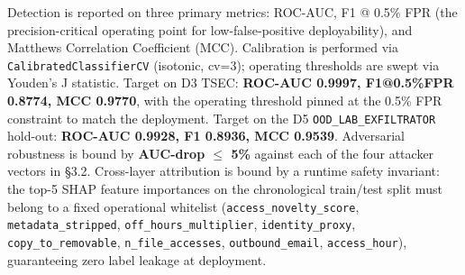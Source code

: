 Detection is reported on three primary metrics: ROC-AUC, F1 @ 0.5\% FPR (the precision-critical operating point for low-false-positive deployability), and Matthews Correlation Coefficient (MCC). Calibration is performed via \texttt{CalibratedClassifierCV} (isotonic, cv=3); operating thresholds are swept via Youden's J statistic. Target on D3 TSEC: \textbf{ROC-AUC 0.9997, F1@0.5\%FPR 0.8774, MCC 0.9770}, with the operating threshold pinned at the 0.5\% FPR constraint to match the deployment. Target on the D5 \texttt{OOD\_\allowbreak LAB\_\allowbreak EXFILTRATOR} hold-out: \textbf{ROC-AUC 0.9928, F1 0.8936, MCC 0.9539}. Adversarial robustness is bound by \textbf{AUC-drop $\le$ 5\%} against each of the four attacker vectors in \S3.2. Cross-layer attribution is bound by a runtime safety invariant: the top-5 SHAP feature importances on the chronological train/test split must belong to a fixed operational whitelist (\texttt{access\_\allowbreak novelty\_\allowbreak score}, \texttt{metadata\_\allowbreak stripped}, \texttt{off\_\allowbreak hours\_\allowbreak multiplier}, \texttt{identity\_\allowbreak proxy}, \texttt{copy\_\allowbreak to\_\allowbreak removable}, \texttt{n\_\allowbreak file\_\allowbreak accesses}, \texttt{outbound\_\allowbreak email}, \texttt{access\_\allowbreak hour}), guaranteeing zero label leakage at deployment.
